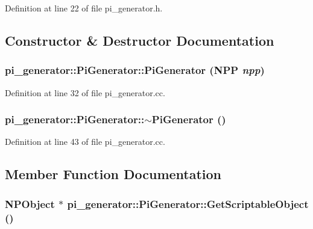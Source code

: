 Definition at line 22 of file pi\_\-generator.h.



\subsection{Constructor \& Destructor Documentation}
\hypertarget{classpi__generator_1_1_pi_generator_a0f5a55bbb942dee1b185447f0a7e24be}{
\subsubsection[{PiGenerator}]{\setlength{\rightskip}{0pt plus 5cm}pi\_\-generator::PiGenerator::PiGenerator ({\bf NPP} {\em npp})}}
\label{classpi__generator_1_1_pi_generator_a0f5a55bbb942dee1b185447f0a7e24be}


Definition at line 32 of file pi\_\-generator.cc.

\hypertarget{classpi__generator_1_1_pi_generator_ac7d9c07492fd86678b8f66643e1e8c1e}{
\subsubsection[{$\sim$PiGenerator}]{\setlength{\rightskip}{0pt plus 5cm}pi\_\-generator::PiGenerator::$\sim$PiGenerator ()}}
\label{classpi__generator_1_1_pi_generator_ac7d9c07492fd86678b8f66643e1e8c1e}


Definition at line 43 of file pi\_\-generator.cc.



\subsection{Member Function Documentation}
\hypertarget{classpi__generator_1_1_pi_generator_ac65f31616ae3d223bdc01b91aea91762}{
\subsubsection[{GetScriptableObject}]{\setlength{\rightskip}{0pt plus 5cm}NPObject $\ast$ pi\_\-generator::PiGenerator::GetScriptableObject ()}}
\label{classpi__generator_1_1_pi_generator_ac65f31616ae3d223bdc01b91aea91762}


